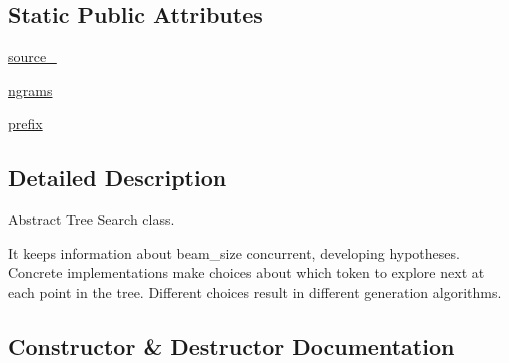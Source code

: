 \subsection*{Static Public Attributes}
\begin{DoxyCompactItemize}
\item 
\hyperlink{classparlai_1_1core_1_1torch__generator__agent_1_1TreeSearch_aeeed17550050be7b86c9e238b9df66e5}{source\+\_\+}
\item 
\hyperlink{classparlai_1_1core_1_1torch__generator__agent_1_1TreeSearch_aa9b00008fefdb77e7701ddbfc1865919}{ngrams}
\item 
\hyperlink{classparlai_1_1core_1_1torch__generator__agent_1_1TreeSearch_a2845139bf44df2fa8428565cd7558ce2}{prefix}
\end{DoxyCompactItemize}


\subsection{Detailed Description}
\begin{DoxyVerb}Abstract Tree Search class.

It keeps information about beam_size concurrent, developing hypotheses. Concrete
implementations make choices about which token to explore next at each point in the
tree. Different choices result in different generation algorithms.
\end{DoxyVerb}
 

\subsection{Constructor \& Destructor Documentation}
\mbox{\label{classparlai_1_1core_1_1torch__generator__agent_1_1TreeSearch_ac1496d6205b8156573f0e79f4ff5fa43}} 
